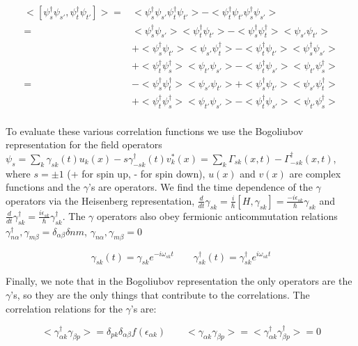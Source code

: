 \documentclass{article}
\begin{document}
\begin{align*}
<[\psi^\dagger_{s} \psi_{s'},\psi^\dagger_{t} \psi_{t'}]>=&<\psi^\dagger_{s} \psi_{s'}\psi^\dagger_{t} \psi_{t'}>-<\psi^\dagger_{t} \psi_{t'}\psi^\dagger_{s} \psi_{s'}> \\
=&<\psi^\dagger_{s}\psi_{s'}><\psi^\dagger_{t}\psi_{t'}>-<\psi^\dagger_{s}\psi^\dagger_{t}><\psi_{s'}\psi_{t'}> \\ 
&+<\psi^\dagger_{s}\psi_{t'}><\psi_{s'}\psi^\dagger_{t}>-<\psi^\dagger_{t}\psi_{t'}><\psi^\dagger_{s}\psi_{s'}> \\ 
&+<\psi^\dagger_{t}\psi^\dagger_{s}><\psi_{t'}\psi_{s'}>-<\psi^\dagger_{t}\psi_{s'}><\psi_{t'}\psi^\dagger_{s}> \\
=&-<\psi^\dagger_{s}\psi^\dagger_{t}><\psi_{s'}\psi_{t'}>+<\psi^\dagger_{s}\psi_{t'}><\psi_{s'}\psi^\dagger_{t}> \\ 
&+<\psi^\dagger_{t}\psi^\dagger_{s}><\psi_{t'}\psi_{s'}>-<\psi^\dagger_{t}\psi_{s'}><\psi_{t'}\psi^\dagger_{s}> \\
\end{align*}

To evaluate these various correlation functions we use the Bogoliubov representation for the field operators $\psi_s=\sum\limits_k \gamma_{sk}(t)u_k(x)-s\gamma_{-sk}^\dagger(t)v^*_{k}(x)=\sum\limits_k \Gamma_{sk}(x,t)-\Gamma_{-sk}^\dagger(x,t)$, where $s=\pm1$ (+ for spin up, - for spin down), $u(x)$ and $v(x)$ are complex functions and the $\gamma$'s are operators. We find the time dependence of the $\gamma$ operators via the Heisenberg representation, $\frac{d}{dt}\gamma_{sk}=\frac{i}{\hbar}[H,\gamma_{sk}]=\frac{-i\epsilon_{sk}}{\hbar}\gamma_{sk}$ and $\frac{d}{dt}\gamma^\dagger_{sk}=\frac{i\epsilon_{sk}}{\hbar}\gamma^\dagger_{sk}$. The $\gamma$ operators also obey fermionic anticommutation relations ${\gamma^\dagger_{n\alpha}, \gamma_{m\beta}}=\delta_{\alpha\beta}\delta{nm}$, ${\gamma_{n\alpha},\gamma_{m\beta}}=0$

\begin{equation*}
\gamma_{sk}(t)=\gamma_{sk}e^{-i\omega_{sk}t}\quad\quad \gamma^\dagger_{sk}(t)=\gamma^\dagger_{sk}e^{i\omega_{sk}t}
\end{equation*}

Finally, we note that in the Bogoliubov representation the only operators are the $\gamma$'s, so they are the only things that contribute to the correlations. The correlation relations for the $\gamma$'s are:

\begin{equation*}
<\gamma^\dagger_{\alpha k}\gamma_{\beta p}>=\delta_{pk}\delta_{\alpha \beta}f(\epsilon_{\alpha k}) \quad\quad <\gamma_{\alpha k}\gamma_{\beta p}>=<\gamma^\dagger_{\alpha k}\gamma^\dagger_{\beta p}>=0
\end{equation*}
\end{document}
